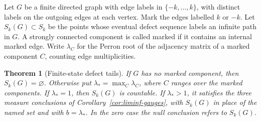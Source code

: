 \documentclass[11pt]{article}
\newtheorem{theorem}{Theorem}
\theoremstyle{definition}
\theoremstyle{remark}
\begin{document}
Let $G$ be a finite directed graph with edge labels in
$\{-k,\ldots,k\}$, with distinct labels on the outgoing edges at each
vertex. Mark the edges labelled $k$ or $-k$. Let $S_k(G)\subset S_k$ be
the points whose eventual defect sequence labels an infinite path in $G$.
A strongly connected component is called marked if it contains an internal
marked edge. Write $\lambda_C$ for the Perron root of the adjacency matrix
of a marked component $C$, counting edge multiplicities.

\begin{theorem}[Finite-state defect tails]\label{thm:finite-state-tail}
If $G$ has no marked component, then $S_k(G)=\varnothing$.
Otherwise put $\lambda_*=\max_C\lambda_C$, where $C$ ranges over
the marked components. If $\lambda_*=1$, then $S_k(G)$ is countable.
If $\lambda_*>1$, it satisfies the three measure conclusions of
Corollary~\ref{cor:liminf-gauges}, with $S_k(G)$ in place of the named
set and with $b=\lambda_*$. In the zero case the null conclusion refers
to $S_k(G)$.
\end{theorem}
\end{document}
